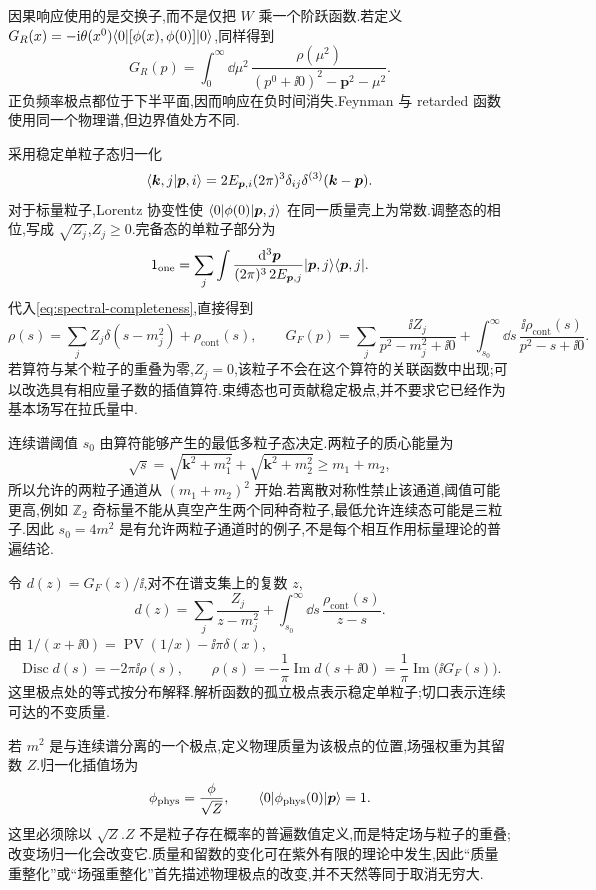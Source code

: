 因果响应使用的是交换子,而不是仅把 $W$ 乘一个阶跃函数.若定义 $G_R(x)=-\mathrm i\theta(x^0)\langle 0\rvert[\phi(x),\phi(0)]\lvert 0\rangle$,同样得到
\[
 G_R(p)=\int_0^\infty\dd\mu^2\,\frac{\rho(\mu^2)}{(p^0+\ii0)^2-\boldsymbol p^2-\mu^2}.
\]
正负频率极点都位于下半平面,因而响应在负时间消失.Feynman 与 retarded 函数使用同一个物理谱,但边界值处方不同.

采用稳定单粒子态归一化
\[
 \langle \boldsymbol k,j\vert \boldsymbol p,i\rangle
 =2E_{\boldsymbol p,i}(2\pi)^3\delta_{ij}\delta^{(3)}(\boldsymbol k-\boldsymbol p).
\]
对于标量粒子,Lorentz 协变性使 $\langle 0\rvert\phi(0)\lvert \boldsymbol p,j\rangle$ 在同一质量壳上为常数.调整态的相位,写成 $\sqrt{Z_j}$,$Z_j\geq0$.完备态的单粒子部分为
\[
 1_{\mathrm{one}}=\sum_j\int\frac{\,\mathrm d^3\boldsymbol p}{(2\pi)^3\,2E_{\boldsymbol p,j}}
 \lvert \boldsymbol p,j\rangle\langle \boldsymbol p,j\rvert.
\]
代入\eqref{eq:spectral-completeness},直接得到
\begin{equation}\label{eq:rho-pole-continuum}
 \rho(s)=\sum_jZ_j\delta(s-m_j^2)+\rho_{\mathrm{cont}}(s),\qquad
 G_F(p)=\sum_j\frac{\ii Z_j}{p^2-m_j^2+\ii0}
 +\int_{s_0}^\infty\dd s\,\frac{\ii\rho_{\mathrm{cont}}(s)}{p^2-s+\ii0}.
\end{equation}
若算符与某个粒子的重叠为零,$Z_j=0$,该粒子不会在这个算符的关联函数中出现;可以改选具有相应量子数的插值算符.束缚态也可贡献稳定极点,并不要求它已经作为基本场写在拉氏量中.

连续谱阈值 $s_0$ 由算符能够产生的最低多粒子态决定.两粒子的质心能量为
\[
 \sqrt{s}=\sqrt{\boldsymbol k^2+m_1^2}+\sqrt{\boldsymbol k^2+m_2^2}
 \geq m_1+m_2,
\]
所以允许的两粒子通道从 $(m_1+m_2)^2$ 开始.若离散对称性禁止该通道,阈值可能更高,例如 $\mathbb Z_2$ 奇标量不能从真空产生两个同种奇粒子,最低允许连续态可能是三粒子.因此 $s_0=4m^2$ 是有允许两粒子通道时的例子,不是每个相互作用标量理论的普遍结论.

令 $d(z)=G_F(z)/\ii$,对不在谱支集上的复数 $z$,
\[
 d(z)=\sum_j\frac{Z_j}{z-m_j^2}+\int_{s_0}^\infty\dd s\,\frac{\rho_{\mathrm{cont}}(s)}{z-s}.
\]
由 $1/(x+\ii0)=\operatorname{PV}(1/x)-\ii\pi\delta(x)$,
\begin{equation}\label{eq:spectral-discontinuity}
 \operatorname{Disc}d(s)=-2\pi\ii\rho(s),\qquad
 \rho(s)=-\frac1\pi\operatorname{Im}d(s+\ii0)
 =\frac1\pi\operatorname{Im}\bigl(\ii G_F(s)\bigr).
\end{equation}
这里极点处的等式按分布解释.解析函数的孤立极点表示稳定单粒子;切口表示连续可达的不变质量.

若 $m^2$ 是与连续谱分离的一个极点,定义物理质量为该极点的位置,场强权重为其留数 $Z$.归一化插值场为
\[
 \phi_{\mathrm{phys}}=\frac{\phi}{\sqrt Z},\qquad
 \langle 0\rvert\phi_{\mathrm{phys}}(0)\lvert \boldsymbol p\rangle=1.
\]
这里必须除以 $\sqrt Z$.$Z$ 不是粒子存在概率的普遍数值定义,而是特定场与粒子的重叠;改变场归一化会改变它.质量和留数的变化可在紫外有限的理论中发生,因此“质量重整化”或“场强重整化”首先描述物理极点的改变,并不天然等同于取消无穷大.

